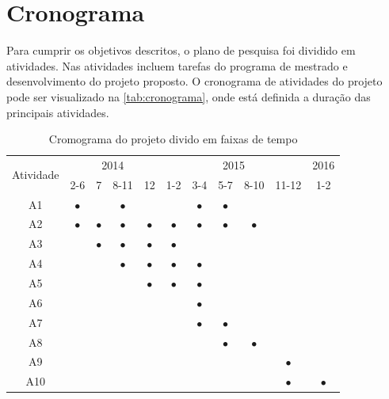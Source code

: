 \documentclass[mestrado, pre-defesa, english, brazil]{packages/icmc}
\begin{document}
\section{Cronograma}

Para cumprir os objetivos descritos, o plano de pesquisa foi dividido em atividades. Nas atividades incluem tarefas do programa de mestrado e desenvolvimento do projeto proposto. O cronograma de atividades do projeto pode ser visualizado na \autoref{tab:cronograma}, onde está definida a duração das principais atividades.

\begin{table}[!htbp]
	\centering
	\caption{Cromograma do projeto divido em faixas de tempo} \label{tab:cronograma}
	\begin{tabular}{c|c|c|c|c|c|c|c|c|c|c}
		\hline 
		\multirow{2}{*}{Atividade} & \multicolumn{4}{c|}{2014} & \multicolumn{5}{c|}{2015}  & \multicolumn{1}{c}{2016} \\ \cline{2-11} 
		& 2-6 & 7 & 8-11 & 12 & 1-2 & 3-4 & 5-7 & 8-10 & 11-12 & 1-2\\ \hline 
		A1 & $\bullet$ & & $\bullet$ & & & $\bullet$ & $\bullet$ & & & \\ \hline
		A2 & $\bullet$ & $\bullet$ & $\bullet$ & $\bullet$ & $\bullet$ & $\bullet$ & $\bullet$ & $\bullet$ & & \\ \hline
		A3 & & $\bullet$ & $\bullet$ & $\bullet$ & $\bullet$ & & & & & \\ \hline
		A4 & & & $\bullet$ & $\bullet$ & $\bullet$ & $\bullet$ & & & & \\ \hline
		A5 & & & & $\bullet$ & $\bullet$ & $\bullet$ & & & & \\ \hline
		A6 & & & & & & $\bullet$ & & & & \\ \hline
		A7 & & & & & & $\bullet$ & $\bullet$ & & & \\ \hline 
		A8 & & & & & & & $\bullet$ & $\bullet$ & & \\ \hline
		A9 & & & & & & & & & $\bullet$ & \\ \hline
		A10 & & & & & & & & & $\bullet$ & $\bullet$ \\ \hline
	\end{tabular}
\end{table}%
\end{document}
